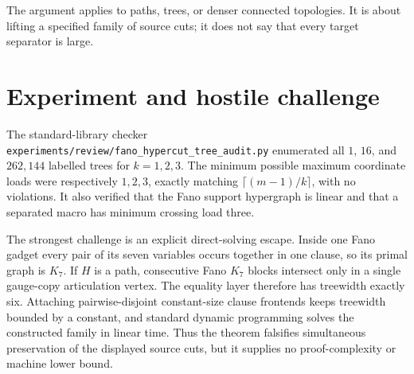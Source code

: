 \documentclass[11pt]{article}
\begin{document}
The argument applies to paths, trees, or denser connected topologies.  It is
about lifting a specified family of source cuts; it does not say that every
target separator is large.

\section{Experiment and hostile challenge}
The standard-library checker
\texttt{experiments/review/fano\_hypercut\_tree\_audit.py} enumerated all
$1$, $16$, and $262{,}144$ labelled trees for $k=1,2,3$.  The minimum possible
maximum coordinate loads were respectively $1,2,3$, exactly matching
$\lceil(m-1)/k\rceil$, with no violations.  It also verified that the Fano
support hypergraph is linear and that a separated macro has minimum crossing
load three.

The strongest challenge is an explicit direct-solving escape.  Inside one
Fano gadget every pair of its seven variables occurs together in one clause,
so its primal graph is $K_7$.  If $H$ is a path, consecutive Fano $K_7$ blocks
intersect only in a single gauge-copy articulation vertex.  The equality
layer therefore has treewidth exactly six.  Attaching pairwise-disjoint
constant-size clause frontends keeps treewidth bounded by a constant, and
standard dynamic programming solves the constructed family in linear time.
Thus the theorem falsifies simultaneous preservation of the displayed
source cuts, but it supplies no proof-complexity or machine lower bound.
\end{document}
